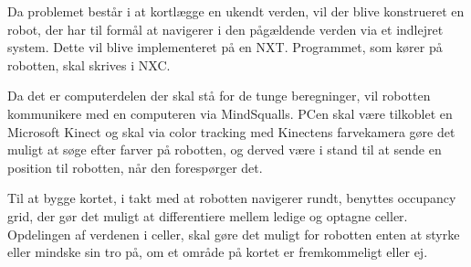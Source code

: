 Da problemet består i at kortlægge en ukendt verden, vil der blive konstrueret en robot, der har til formål at navigerer i den pågældende verden via et indlejret system.
Dette vil blive implementeret på en NXT.
Programmet, som kører på robotten, skal skrives i NXC.

Da det er computerdelen der skal stå for de tunge beregninger, vil robotten kommunikere med en computeren via MindSqualls.
PCen skal være tilkoblet en Microsoft Kinect og skal via color tracking med Kinectens farvekamera gøre det muligt at søge efter farver på robotten, og derved være i stand til at sende en position til robotten, når den forespørger det.

Til at bygge kortet, i takt med at robotten navigerer rundt, benyttes occupancy grid, der gør det muligt at differentiere mellem ledige og optagne celler.
Opdelingen af verdenen i celler, skal gøre det muligt for robotten enten at styrke eller mindske sin tro på, om et område på kortet er fremkommeligt eller ej.